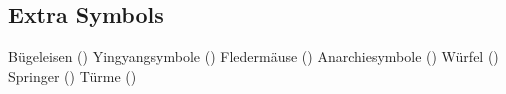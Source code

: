 \documentclass[fleqn,reqno,10pt]{article}
\begin{document}
\subsection{Extra Symbols}


\begin{exe}
\ex
  \begin{xlist}
  \ex Bügeleisen (\IroningIII)
  \ex Yingyangsymbole (\Yinyang)
  \ex Fledermäuse (\Bat)
  \ex Anarchiesymbole (\CircledA)
  \ex Würfel ()
  \ex Springer (\symknight)
  \ex Türme (\symrook)
  \end{xlist}
\end{exe}






\end{document}
